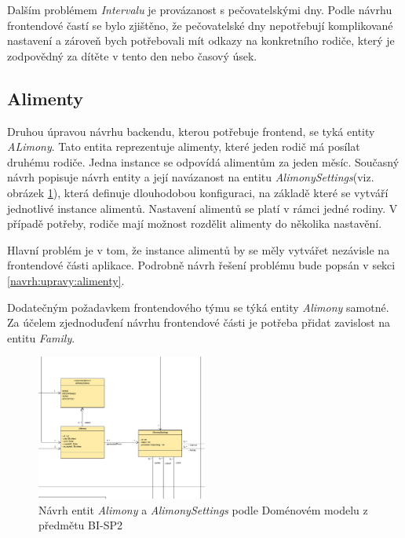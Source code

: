         Dalším problémem \textit{Intervalu} je provázanost s pečovatelskými dny. Podle návrhu frontendové častí se bylo zjištěno, že pečovatelské dny nepotřebují komplikované nastavení a zároveň bych potřebovali mít odkazy na konkretního rodiče, který je zodpovědný za dítěte v tento den nebo časový úsek.
    
    \subsection{Alimenty}
        Druhou úpravou návrhu backendu, kterou potřebuje frontend, se tyká entity \textit{ALimony}.
        Tato entita reprezentuje alimenty, které jeden rodič má posílat druhému rodiče. Jedna instance se odpovídá alimentům za jeden měsíc. Současný návrh popisuje návrh entity a její navázanost na entitu \textit{AlimonySettings}(viz. obrázek \ref{image:aliomny-draft1}), která definuje dlouhodobou konfiguraci, na základě které se vytváří jednotlivé instance alimentů. Nastavení alimentů se platí v rámci jedné rodiny. V případě potřeby, rodiče mají možnost rozdělit alimenty do několika nastavění. 
        
        Hlavní problém je v tom, že instance alimentů by se měly vytvářet nezávisle na frontendové části aplikace. Podrobně návrh řešení problému bude popsán v sekci \ref{navrh:upravy:alimenty}.
        
        Dodatečným požadavkem frontendového týmu se týká entity \textit{Alimony} samotné. Za účelem zjednoduďení návrhu frontendové části je potřeba přidat zavislost na entitu \textit{Family}.
        \begin{figure}\centering
	        \includegraphics[width=0.5\textwidth]{pdfs/AlimonyDraft1}
	        \caption[Návrh \textit{Alimony} a \textit{AlimonySettings}]{Návrh entit \textit{Alimony} a \textit{AlimonySettings} podle Doménovém modelu z předmětu BI-SP2}\label{image:aliomny-draft1}
        \end{figure}

